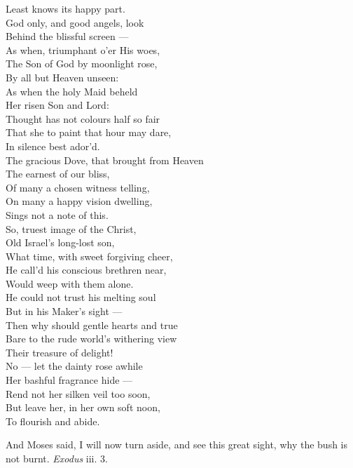  Least knows its happy part. \\
  God only, and good angels, look \\
 Behind the blissful screen — \\
 As when, triumphant o’er His woes, \\
 The Son of God by moonlight rose, \\
 By all but Heaven unseen: \\
  As when the holy Maid beheld \\
 Her risen Son and Lord: \\
 Thought has not colours half so fair \\
 That she to paint that hour may dare, \\
 In silence best ador’d. \\
  The gracious Dove, that brought from Heaven \\
 The earnest of our bliss, \\
 Of many a chosen witness telling, \\
 On many a happy vision dwelling, \\
 Sings not a note of this. \\
  So, truest image of the Christ, \\
 Old Israel’s long-lost son, \\
 What time, with sweet forgiving cheer, \\
 He call’d his conscious brethren near, \\
 Would weep with them alone. \\
  He could not trust his melting soul \\
 But in his Maker’s sight — \\
 Then why should gentle hearts and true \\
 Bare to the rude world’s withering view \\
 Their treasure of delight! \\
  No — let the dainty rose awhile \\
 Her bashful fragrance hide — \\
 Rend not her silken veil too soon, \\
 But leave her, in her own soft noon, \\
 To flourish and abide.\\


And Moses said, I will now turn aside, and see this great sight, why the bush is not burnt. \emph{Exodus} iii. 3.

